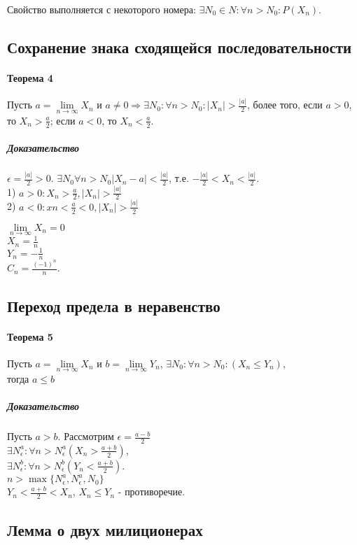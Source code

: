 \documentclass[10pt]{article}
\newcommand{\limninf}{\lim\limits_{n \to \infty}}
\begin{document}
			Свойство выполняется с некоторого номера: $\exists N_0 \in N : \forall n > N_0 : P(X_n)$.
		\subsection{Сохранение знака сходящейся последовательности}
			\paragraph{Теорема 4}
			Пусть $a = \limninf X_n$ и $a \neq 0 \Rightarrow \exists N_0 : \forall n > N_0 : |X_n| > \frac{|a|}{2}$, более того, если $a > 0$, то $X_n > \frac{a}{2}$; если $a < 0$, то $X_n < \frac{a}{2}$.
			\subparagraph{Доказательство}
			$\epsilon = \frac{|a|}{2}	> 0$. $\exists N_0 \forall n > N_0 |X_n - a| < \frac{|a|}{2}$, т.е. $-\frac{|a|}{2} < X_n < \frac{|a|}{2}$.\\
			1) $a > 0 : X_n > \frac{a}{2}, |X_n| > \frac{|a|}{2}$\\
			2) $a < 0 : xn < \frac{a}{2} < 0, |X_n| > \frac{|a|}{2}$
			
			$\limninf X_n = 0$\\
			$X_n = \frac{1}{n}$\\
			$Y_n = -\frac{1}{n}$\\
			$C_n = \frac{(-1)^n}{n}$.
		\subsection{Переход предела в неравенство}
			\paragraph{Теорема 5}
			Пусть $a = \lim\limits_{n\to \infty} X_n$ и $b = \lim\limits_{n\to\infty} Y_n$,
			$\exists N_0 : \forall n > N_0 : (X_n \le Y_n)$,\\тогда $a \le b$
			\subparagraph{Доказательство} Пусть $a > b$. Рассмотрим $\epsilon = \frac{a-b}{2}$\\
			$\exists N_\epsilon^a : \forall n > N_\epsilon^a (X_n > \frac{a+b}{2})$,\\
			$\exists N_\epsilon^b : \forall n > N_\epsilon^b (Y_n < \frac{a+b}{2})$.\\
			$n > \max \{N_\epsilon^a, N_\epsilon^a, N_0\}$\\
			$Y_n < \frac{a+b}{2} < X_n$, $X_n \le Y_n$ - противоречие.
		\subsection{Лемма о двух милиционерах}
\end{document}
